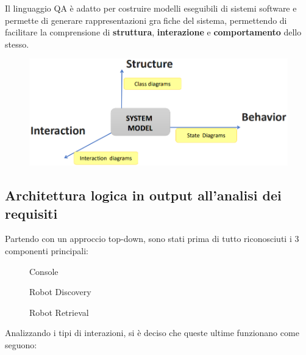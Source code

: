 Il linguaggio QA è adatto per costruire modelli eseguibili di sistemi software e permette di generare rappresentazioni grafiche del sistema,
permettendo di facilitare la comprensione di \textbf{struttura}, \textbf{interazione} e \textbf{comportamento} dello stesso.

\begin{figure}[H]
  \centering
  \includegraphics[width=1\textwidth]{res/logicalArchitecture.png}
  \label{fig:logicalArchitecture}
\end{figure}

\subsection{Architettura logica in output all'analisi dei requisiti}

Partendo con un approccio top-down, sono stati prima di tutto riconosciuti i 3 componenti principali:

\begin{figure}[H]
  \centering
  \caption{Console}%
  \label{fig:sp1:req:console}
\end{figure}

\begin{figure}[H]
  \centering
  \caption{Robot Discovery}%
  \label{fig:sp1:req:robotdiscovery}
\end{figure}

\begin{figure}[H]
  \centering
  \caption{Robot Retrieval}%
  \label{fig:sp1:req:robotretrieval}
\end{figure}

Analizzando i tipi di interazioni, si è deciso che queste ultime funzionano come seguono:

